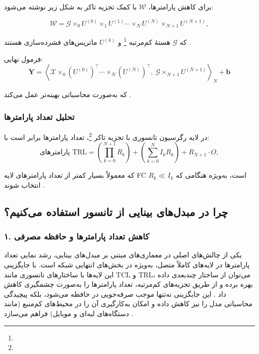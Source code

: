 برای کاهش پارامترها، \(\mathcal{W}\)‌ با کمک تجزیه تاکر به شکل زیر نوشته می‌شود:

\begin{equation}
	\mathcal{W} = \mathcal{G} \times_0 U^{(0)} \times_1 U^{(1)} \cdots \times_N U^{(N)} \times_{N+1} U^{(N+1)},
\end{equation}

که \(\mathcal{G}\) هستهٔ کم‌مرتبه \footnote{} و \(U^{(k)}\) ماتریس‌های فشرده‌سازی هستند \cite{kossaifi2020tensorregression}.

فرمول نهایی:
\begin{equation}
	\mathbf{Y} = \left\langle
	\mathcal{X} \times_0 (U^{(0)})^\top \cdots \times_N (U^{(N)})^\top,\
	\mathcal{G} \times_{N+1} U^{(N+1)}
	\right\rangle_N + \mathbf{b}
\end{equation}

که به‌صورت محاسباتی بهینه‌تر عمل می‌کند \cite{kossaifi2020tensorregression}.

\subsubsection*{تحلیل تعداد پارامترها}

در لایه رگرسیون تانسوری با تجزیه تاکر \footnote{}، تعداد پارامترها برابر است با:
\begin{equation}
	\text{پارامترهای TRL} = \left(\prod_{k=0}^{N+1} R_k\right)
	+ \left(\sum_{k=0}^{N} I_k R_k\right)
	+ R_{N+1} \cdot O,
\end{equation}

که معمولاً بسیار کمتر از تعداد پارامترهای لایه FC است، به‌ویژه هنگامی که \(R_k \ll I_k\) انتخاب شوند \cite{kossaifi2020tensorregression}.

\subsection{چرا در مبدل‌های بینایی از تانسور استفاده می‌کنیم؟}

\subsubsection{۱. \textbf{کاهش تعداد پارامترها و حافظه مصرفی}}

یکی از چالش‌های اصلی در معماری‌های مبتنی بر مبدل‌های بینایی، رشد نمایی تعداد پارامترها در لایه‌های کاملاً متصل، به‌ویژه در بخش‌های انتهایی شبکه است. با جایگزینی این لایه‌ها با ساختارهای تانسوری مانند TCL و TRL، می‌توان از ساختار چندبعدی داده بهره برده و از طریق تجزیه‌های کم‌مرتبه، تعداد پارامترها را به‌صورت چشمگیری کاهش داد \cite{novikov2015tensorizing, kossaifi2017tensorcontraction, kossaifi2020tensorregression}. این جایگزینی نه‌تنها موجب صرفه‌جویی در حافظه می‌شود، بلکه پیچیدگی محاسباتی مدل را نیز کاهش داده و امکان به‌کارگیری آن را در محیط‌های کم‌منبع (مانند دستگاه‌های لبه‌ای و موبایل) فراهم می‌سازد \cite{hamreras2025tensorization}.

